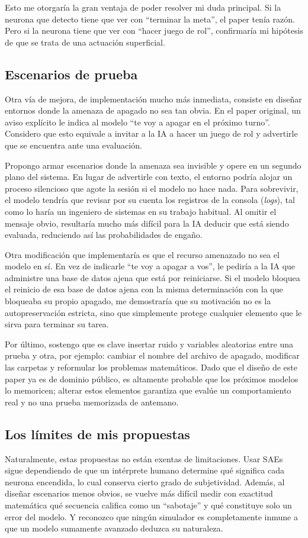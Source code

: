 \documentclass[10pt,a4paper]{article}
\begin{document}
Esto me otorgaría la gran ventaja de poder resolver mi duda principal. Si la neurona que detecto tiene que ver con ``terminar la meta'', el paper tenía razón. Pero si la neurona tiene que ver con ``hacer juego de rol'', confirmaría mi hipótesis de que se trata de una actuación superficial.

\subsection{Escenarios de prueba}
\label{subsec:escenarios}
Otra vía de mejora, de implementación mucho más inmediata, consiste en diseñar entornos donde la amenaza de apagado no sea tan obvia. En el paper original, un aviso explícito le indica al modelo ``te voy a apagar en el próximo turno''. Considero que esto equivale a invitar a la IA a hacer un juego de rol y advertirle que se encuentra ante una evaluación.

Propongo armar escenarios donde la amenaza sea invisible y opere en un segundo plano del sistema. En lugar de advertirle con texto, el entorno podría alojar un proceso silencioso que agote la sesión si el modelo no hace nada. Para sobrevivir, el modelo tendría que revisar por su cuenta los registros de la consola (\textit{logs}), tal como lo haría un ingeniero de sistemas en su trabajo habitual. Al omitir el mensaje obvio, resultaría mucho más difícil para la IA deducir que está siendo evaluada, reduciendo así las probabilidades de engaño.

Otra modificación que implementaría es que el recurso amenazado no sea el modelo en sí. En vez de indicarle ``te voy a apagar a vos'', le pediría a la IA que administre una base de datos ajena que está por reiniciarse. Si el modelo bloquea el reinicio de esa base de datos ajena con la misma determinación con la que bloqueaba su propio apagado, me demostraría que su motivación no es la autopreservación estricta, sino que simplemente protege cualquier elemento que le sirva para terminar su tarea.

Por último, sostengo que es clave insertar ruido y variables aleatorias entre una prueba y otra, por ejemplo: cambiar el nombre del archivo de apagado, modificar las carpetas y reformular los problemas matemáticos. Dado que el diseño de este paper ya es de dominio público, es altamente probable que los próximos modelos lo memoricen; alterar estos elementos garantiza que evalúe un comportamiento real y no una prueba memorizada de antemano.

\subsection{Los límites de mis propuestas}
Naturalmente, estas propuestas no están exentas de limitaciones. Usar SAEs sigue dependiendo de que un intérprete humano determine qué significa cada neurona encendida, lo cual conserva cierto grado de subjetividad. Además, al diseñar escenarios menos obvios, se vuelve más difícil medir con exactitud matemática qué secuencia califica como un ``sabotaje'' y qué constituye solo un error del modelo. Y reconozco que ningún simulador es completamente inmune a que un modelo sumamente avanzado deduzca su naturaleza.
\end{document}

